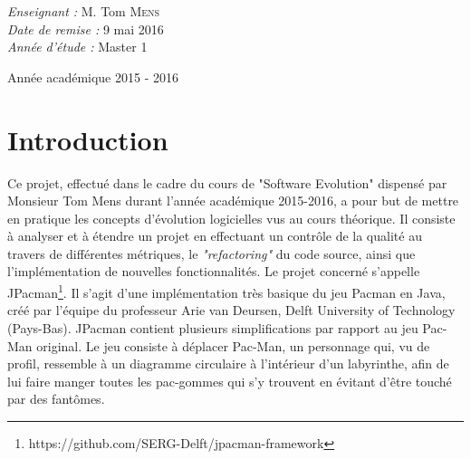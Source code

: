 \documentclass[12pt, openany]{report}
\begin{document}
\begin{titlepage}
\begin{sffamily}
\begin{center}
\begin{minipage}{0.4\textwidth}
\begin{flushleft}
      \end{flushleft}
    \end{minipage}
    \begin{minipage}{0.4\textwidth}
      \begin{flushright} \large
        \emph{Enseignant :} M. Tom  \textsc{Mens}\\
        \emph{Date de remise : } 9 mai 2016\\
        \emph{Année d'étude : } Master 1
      \end{flushright}
    \end{minipage}

    \vfill

    {\large Année académique 2015 - 2016}
	
  \end{center}
  \end{sffamily}
\end{titlepage}




\newpage

	\renewcommand{\thesection}{\arabic{section}}
	\tableofcontents
	\newpage
	\setcounter{secnumdepth}{3}
	\setcounter{tocdepth}{4}
	

\section{Introduction}
Ce projet, effectué dans le cadre du cours de "Software Evolution" dispensé par Monsieur Tom Mens durant l'année académique 2015-2016, a pour but de mettre en pratique les concepts d'évolution logicielles vus au cours théorique. Il consiste à analyser et à étendre un projet en effectuant un contrôle de la qualité au travers de différentes métriques, le \textit{"refactoring"} du code source, ainsi que l'implémentation de nouvelles fonctionnalités. Le projet concerné s'appelle JPacman\footnote{https://github.com/SERG-Delft/jpacman-framework}. Il s'agit d'une implémentation très basique du jeu Pacman en Java, créé par l'équipe  du professeur Arie van Deursen, Delft University of Technology (Pays-Bas).
 JPacman contient plusieurs simplifications par rapport au jeu Pac-Man original. Le jeu consiste à déplacer Pac-Man, un personnage qui, vu de profil, ressemble à un diagramme circulaire à l’intérieur d’un labyrinthe, afin de lui faire manger toutes les pac-gommes qui s’y trouvent en évitant d’être touché par des fantômes.
 
\end{document}
